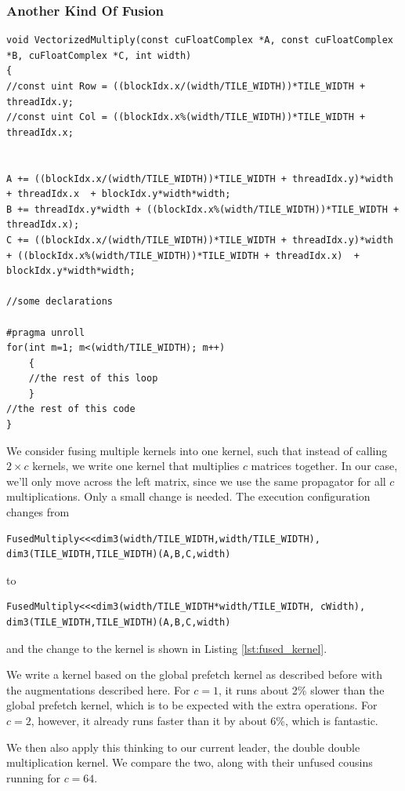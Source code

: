 \documentclass[a4paper,12pt]{report}
\begin{document}
\subsubsection{Another Kind Of Fusion}
\begin{lstlisting}[float,caption=Fused Matrix Multiplication Kernel, label=lst:fused_kernel]
void VectorizedMultiply(const cuFloatComplex *A, const cuFloatComplex *B, cuFloatComplex *C, int width)
{
//const uint Row = ((blockIdx.x/(width/TILE_WIDTH))*TILE_WIDTH + threadIdx.y;
//const uint Col = ((blockIdx.x%(width/TILE_WIDTH))*TILE_WIDTH + threadIdx.x;


A += ((blockIdx.x/(width/TILE_WIDTH))*TILE_WIDTH + threadIdx.y)*width + threadIdx.x  + blockIdx.y*width*width;
B += threadIdx.y*width + ((blockIdx.x%(width/TILE_WIDTH))*TILE_WIDTH + threadIdx.x);
C += ((blockIdx.x/(width/TILE_WIDTH))*TILE_WIDTH + threadIdx.y)*width + ((blockIdx.x%(width/TILE_WIDTH))*TILE_WIDTH + threadIdx.x)  + blockIdx.y*width*width;

//some declarations

#pragma unroll
for(int m=1; m<(width/TILE_WIDTH); m++)
	{
	//the rest of this loop
	}
//the rest of this code
}
\end{lstlisting}
We consider fusing multiple kernels into one kernel, such that instead of calling $2 \times c$ kernels, we write one kernel that multiplies $c$ matrices together.
In our case, we'll only move across the left matrix, since we use the same propagator for all $c$ multiplications.
Only a small change is needed. The execution configuration changes from
\begin{lstlisting}
FusedMultiply<<<dim3(width/TILE_WIDTH,width/TILE_WIDTH), dim3(TILE_WIDTH,TILE_WIDTH)(A,B,C,width)
\end{lstlisting}
to
\begin{lstlisting}
FusedMultiply<<<dim3(width/TILE_WIDTH*width/TILE_WIDTH, cWidth), dim3(TILE_WIDTH,TILE_WIDTH)(A,B,C,width)
\end{lstlisting}
and the change to the kernel is shown in Listing \ref{lst:fused_kernel}.

We write a kernel based on the global prefetch kernel as described before with the augmentations described here.
For $c=1$, it runs about 2\% slower than the global prefetch kernel, which is to be expected with the extra operations.
For $c=2$, however, it already runs faster than it by about 6\%, which is fantastic.

We then also apply this thinking to our current leader, the double double multiplication kernel. We compare the two, along with their unfused cousins running for $c=64$.
\end{document}
